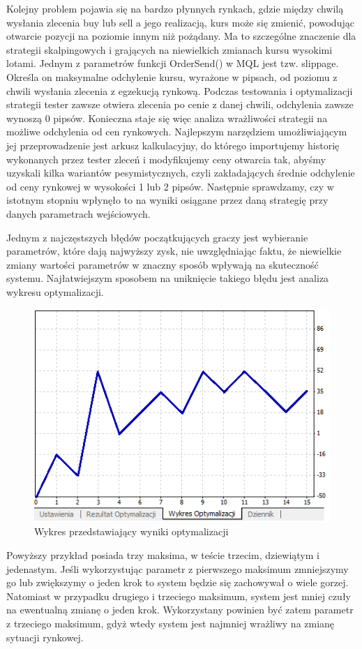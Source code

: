 \documentclass[pdflatex,11pt]{aghdpl}
\begin{document}
Kolejny problem pojawia się na bardzo płynnych rynkach, gdzie między chwilą wysłania zlecenia buy lub sell a jego realizacją, kurs może się zmienić, powodując otwarcie pozycji na poziomie innym niż pożądany. Ma to szczególne znaczenie dla strategii skalpingowych i grających na niewielkich zmianach kursu wysokimi lotami. Jednym z parametrów funkcji OrderSend() w MQL jest tzw. slippage. Określa on maksymalne odchylenie kursu, wyrażone w pipsach, od poziomu z chwili wysłania zlecenia z egzekucją rynkową. Podczas testowania i optymalizacji strategii tester zawsze otwiera zlecenia po cenie z danej chwili, odchylenia zawsze wynoszą 0 pipsów. Konieczna staje się więc analiza wrażliwości strategii na możliwe odchylenia od cen rynkowych. Najlepszym narzędziem umożliwiającym jej przeprowadzenie jest arkusz kalkulacyjny, do którego importujemy historię wykonanych przez tester zleceń i modyfikujemy ceny otwarcia tak, abyśmy uzyskali kilka wariantów pesymistycznych, czyli zakładających średnie odchylenie od ceny rynkowej w wysokości 1 lub 2 pipsów. Następnie sprawdzamy, czy w istotnym stopniu wpłynęło to na wyniki osiągane przez daną strategię przy danych parametrach wejściowych.

Jednym z najczęstszych błędów początkujących graczy jest wybieranie parametrów, które dają najwyższy zysk, nie uwzględniając faktu, że niewielkie zmiany wartości parametrów w znaczny sposób wpływają na skuteczność systemu. Najłatwiejszym sposobem na uniknięcie takiego błędu jest analiza wykresu optymalizacji. 
\begin{figure}[h!]
\begin{center}
\includegraphics[width=12cm]{optymalizacja.png}
\caption{Wykres przedstawiający wyniki optymalizacji}
\label{wynikopt}
\end{center}
\end{figure} 
Powyższy przykład posiada trzy maksima, w teście trzecim, dziewiątym i jedenastym. Jeśli wykorzystując parametr z pierwszego maksimum zmniejszymy go lub zwiększymy o jeden krok to system będzie się zachowywał o wiele gorzej. Natomiast w przypadku drugiego i trzeciego maksimum, system jest mniej czuły na ewentualną zmianę o jeden krok. Wykorzystany powinien być zatem parametr z trzeciego maksimum, gdyż wtedy system jest najmniej wrażliwy na zmianę sytuacji rynkowej.
\end{document}
